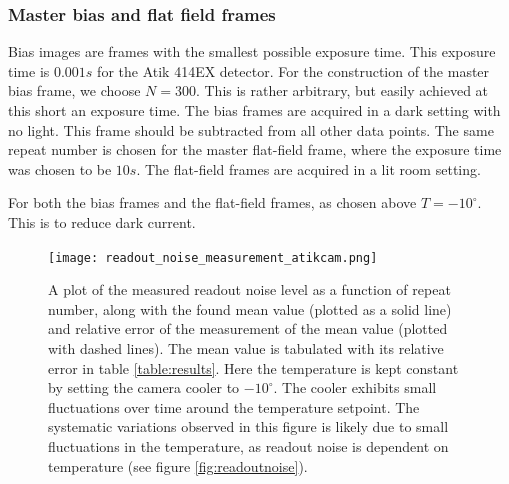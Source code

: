 \documentclass[../main.tex]{subfiles}
\begin{document}
		\subsubsection{Master bias and flat field frames}
		Bias images are frames with the smallest possible exposure time. This exposure time is $0.001s$ for the Atik 414EX detector. For the construction of the master bias frame, we choose $N = 300$. This is rather arbitrary, but easily achieved at this short an exposure time. The bias frames are acquired in a dark setting with no light. This frame should be subtracted from all other data points. The same repeat number is chosen for the master flat-field frame, where the exposure time was chosen to be $10s$.  The flat-field frames are acquired in a lit room setting. 
		
		For both the bias frames and the flat-field frames, as chosen above $T= -10^\circ$. This is to reduce dark current.
		
		\begin{figure}[h!]
			\centering
			\texttt{[image: readout\_noise\_measurement\_atikcam.png]}
			\caption{A plot of the measured readout noise level as a function of repeat number, along with the found mean value (plotted as a solid line) and relative error of the measurement of the mean value (plotted with dashed lines). The mean value is tabulated with its relative error in table \ref{table:results}. Here the temperature is kept constant by setting the camera cooler to $-10^\circ$. The cooler exhibits small fluctuations over time around the temperature setpoint. The systematic variations observed in this figure is likely due to small fluctuations in the temperature, as readout noise is dependent on temperature (see figure \ref{fig:readoutnoise}).}
			\label{fig:ronmeas}
		\end{figure}
		
\end{document}
